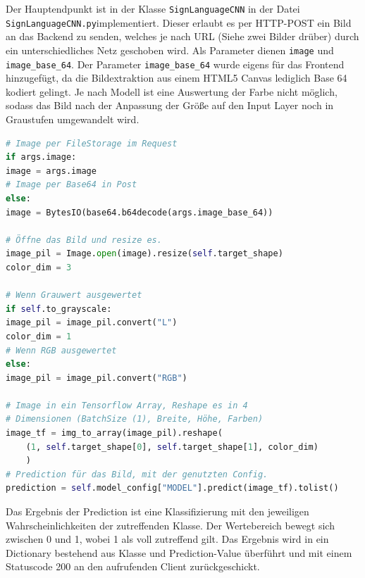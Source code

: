 \documentclass[11pt,bibliography=totocnumbered]{scrartcl}
\begin{document}
Der Hauptendpunkt ist in der Klasse \lstinline[language=pythoninline]|SignLanguageCNN| in der Datei \lstinline[language=pythoninline]|SignLanguageCNN.py|implementiert. Dieser erlaubt es per HTTP-POST ein Bild an das Backend zu senden, welches je nach URL (Siehe zwei Bilder drüber) durch ein unterschiedliches Netz geschoben wird. Als Parameter dienen \lstinline[language=pythoninline]|image| und \lstinline[language=pythoninline]|image_base_64|. Der Parameter \lstinline[language=pythoninline]|image_base_64| wurde eigens für das Frontend hinzugefügt, da die Bildextraktion aus einem HTML5 Canvas lediglich Base 64 kodiert gelingt. Je nach Modell ist eine Auswertung der Farbe nicht möglich, sodass das Bild nach der Anpassung der Größe auf den Input Layer noch in Graustufen umgewandelt wird.
\begin{lstlisting}[language=python,firstnumber=44,caption={Verarbeitung der Bilder im HTTP-Endpunkt.},label=lst:signlanguage_prediction]
# Image per FileStorage im Request
if args.image:
image = args.image
# Image per Base64 in Post
else:
image = BytesIO(base64.b64decode(args.image_base_64))

# Öffne das Bild und resize es.
image_pil = Image.open(image).resize(self.target_shape)
color_dim = 3

# Wenn Grauwert ausgewertet
if self.to_grayscale:
image_pil = image_pil.convert("L")
color_dim = 1
# Wenn RGB ausgewertet
else:
image_pil = image_pil.convert("RGB")

# Image in ein Tensorflow Array, Reshape es in 4
# Dimensionen (BatchSize (1), Breite, Höhe, Farben)
image_tf = img_to_array(image_pil).reshape(
	(1, self.target_shape[0], self.target_shape[1], color_dim)
	)
# Prediction für das Bild, mit der genutzten Config.
prediction = self.model_config["MODEL"].predict(image_tf).tolist()

\end{lstlisting}
Das Ergebnis der Prediction ist eine Klassifizierung mit den jeweiligen Wahrscheinlichkeiten der zutreffenden Klasse. Der Wertebereich bewegt sich zwischen 0 und 1, wobei 1 als voll zutreffend gilt.  Das Ergebnis wird in ein Dictionary bestehend aus Klasse und Prediction-Value überführt und mit einem Statuscode 200 an den aufrufenden Client zurückgeschickt.
\end{document}
